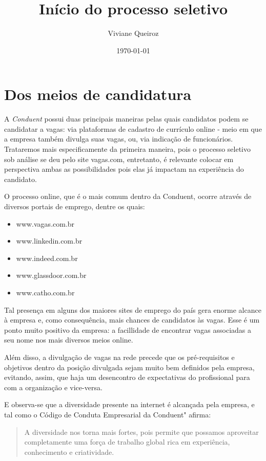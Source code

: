 \documentclass[12pt]{article}
\title{Início do processo seletivo}
\author{Viviane Queiroz}
\date{\today}
\begin{document}
\maketitle


\section*{Dos meios de candidatura}

A \emph {Conduent} possui duas principais maneiras pelas quais candidatos podem se candidatar a vagas: via plataformas de cadastro de currículo online - meio em que a empresa também divulga suas vagas, ou, via indicação de funcionários. Trataremos mais especificamente da primeira maneira, pois o processo seletivo sob análise se deu pelo site vagas.com, entretanto, é relevante colocar em perspectiva ambas as possibilidades pois elas já impactam na experiência do candidato. 

O processo online, que é o mais comum dentro da Conduent, ocorre através de diversos portais de emprego, dentre os quais:

\begin{itemize}
\item www.vagas.com.br
\item www.linkedin.com.br
\item www.indeed.com.br
\item www.glassdoor.com.br
\item www.catho.com.br
\end{itemize} 

Tal presença em alguns dos maiores sites de emprego do país gera enorme alcance à empresa e, como consequência, mais chances de candidatos às vagas. Esse é um ponto muito positivo da empresa: a facillidade de encontrar vagas associadas a seu nome nos mais diversos meios online.

Além disso, a divulgação de vagas na rede precede que os pré-requisitos e objetivos dentro da posição divulgada sejam muito bem definidos pela empresa, evitando, assim, que haja um desencontro de expectativas do profissional para com a organização e vice-versa. 

E observa-se que a diversidade  presente na internet é alcançada pela empresa, e tal como o Código de Conduta Empresarial da Conduent" afirma: 

\begin{quote}
A diversidade nos torna mais fortes, pois permite que possamos aproveitar completamente uma força de trabalho global rica em experiência, conhecimento e criatividade.
\end{quote}
\end{document}
